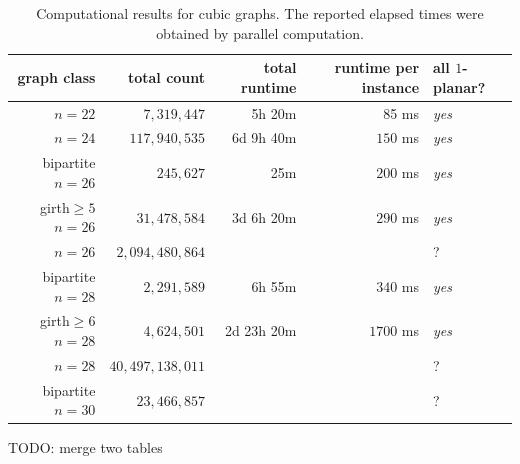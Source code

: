 \documentclass[a4paper,11pt]{article}
\theoremstyle{plain}
\theoremstyle{definition}  %
\newcommand{\yes}{{\it \textcolor{defgreen}{yes}}}
\begin{document}
\begin{table}[!t]
    \small
    \centering
    \caption{Computational results for cubic graphs.  The reported elapsed
    times were obtained by parallel computation.}
    \label{table:cubic}
    \begin{tabular}{|r|r|r|r||C{50pt}|}
        \toprule
        graph class & total count & total runtime & runtime per instance & all $1$-planar? \\
        \midrule
        $n=22$                    & $7,\!319,\!447$ & 5h 20m & 85 ms & \yes \\
        $n=24$                    & $117,\!940,\!535$ & 6d 9h 40m & $150$ ms & \yes \\
        bipartite $n=26$             & $245,\!627$ & 25m & $200$ ms & \yes \\
        girth$\ge 5$ $n=26$          & $31,\!478,\!584$ & 3d 6h 20m & $290$ ms & \yes \\
        $n=26$                    & $2,\!094,\!480,\!864$ & & & ? \\
        bipartite $n=28$          & $2,\!291,\!589$ & 6h 55m & $340$ ms & \yes \\
        girth$\ge 6$ $n=28$          & $4,\!624,\!501$ & 2d 23h 20m & $1700$ ms & \yes \\
        $n=28$                    & $40,\!497,\!138,\!011$ & & & ? \\
        bipartite $n=30$          & $23,\!466,\!857$ & & & ? \\
        \bottomrule
    \end{tabular}
\end{table}

TODO: merge two tables
\end{document}
